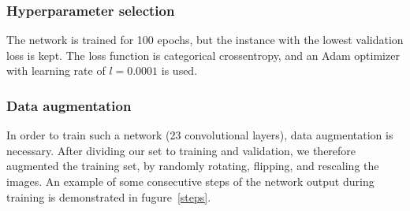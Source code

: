 \documentclass[10pt,conference,compsocconf]{IEEEtran}
\begin{document}
\subsubsection{Hyperparameter selection}		
 The network is trained for 100 epochs, but the instance with the lowest validation loss is kept. The loss function is categorical crossentropy, and an Adam optimizer with learning rate of $l=0.0001$ is used. 
 \subsubsection{Data augmentation}
 In order to train such a network (23 convolutional layers), data augmentation is necessary. After dividing our set to training and validation, we therefore augmented the training set, by randomly rotating, flipping, and rescaling the images. 
 An example of some consecutive steps of the network output during training is demonstrated in fugure~\ref{steps}.
 
\end{document}
